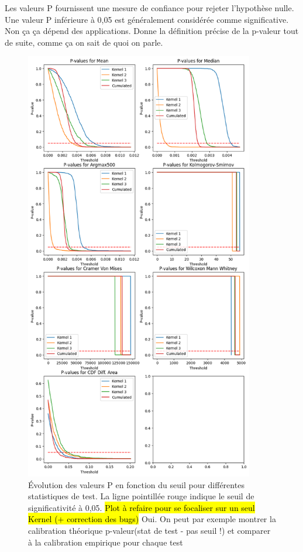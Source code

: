 \documentclass{article}
\newcommand{\dm}[1]{{\color{mulberry} #1}}
\begin{document}
Les valeurs P fournissent une mesure de confiance pour rejeter l'hypothèse nulle. Une valeur P inférieure à 0,05 est généralement considérée comme significative. \dm{Non ça ça dépend des applications. Donne la définition précise de la p-valeur tout de suite, comme ça on sait de quoi on parle. }\\


\begin{figure}[H]
\centering
\includegraphics[width=10cm]{img/p-values.png}
\caption{Évolution des valeurs P en fonction du seuil pour différentes statistiques de test. La ligne pointillée rouge indique le seuil de significativité à 0,05. \hl{Plot à refaire pour se focaliser sur un seul Kernel (+ correction des bugs)} \dm{Oui. On peut par exemple montrer la calibration théorique p-valeur(stat de test - pas seuil !) et comparer à la calibration empirique pour chaque test }}


\label{fig:pvalues}
\end{figure}
\end{document}
